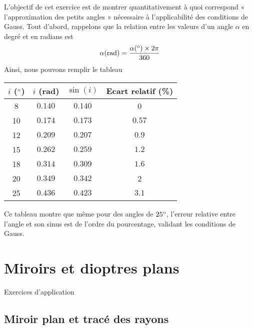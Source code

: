 \documentclass[10pt,notitlepage]{book}
\begin{document}
L'objectif de cet exercice est de montrer quantitativement à quoi correspond
« l'approximation des petits angles » nécessaire à l'applicabilité des conditions
de Gauss. Tout d'abord, rappelons que la relation entre les valeurs d'un angle
$\alpha$ en degré et en radians est
\begin{equation}
	\alpha({\rm rad}) = \dfrac{\alpha(^{\rm o})\times 2\pi}{360}
\end{equation}
Ainsi, nous pouvons remplir le tableau
\begin{table*}[h!]
	\centering
	\begin{tabular}{|c|c|c|c|}
		\hline
		$i$ ($^{\rm o}$) & $i$ (rad) & $\sin(i)$ & Ecart relatif (\%) \\
		\hline
		8 & $0.140$ & $0.140$ & 0 \\
		\hline
		10 & $0.174$ & $0.173$ & $0.57$ \\
		\hline
		12 & $0.209$ & $0.207$ & $0.9$ \\
		\hline
		15 & $0.262$ & $0.259$ & $1.2$ \\
		\hline
		18 & $0.314$ & $0.309$ & $1.6$ \\
		\hline
		20 & $0.349$ & $0.342$ & 2 \\
		\hline
		25 & $0.436$ & $0.423$ & $3.1$ \\
		\hline
	\end{tabular}
\end{table*}
Ce tableau montre que même pour des angles de $25^{\rm o}$, l'erreur relative
entre l'angle et son sinus est de l'ordre du pourcentage, validant les
conditions de Gauss.

\theendnotes

\chapter{Miroirs et dioptres plans}
\vspace*{-47pt}
\begin{center}
    \Huge Exercices d'application
\end{center}

\section{Miroir plan et tracé des rayons}
\end{document}
